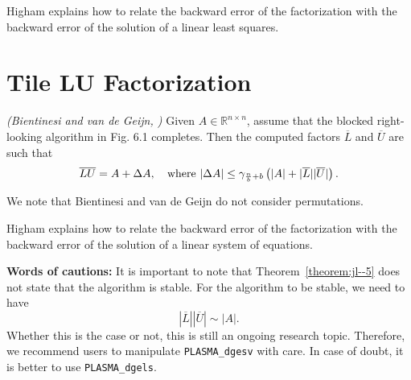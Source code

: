 Higham explains how to relate the backward error of the factorization
with the backward error of the solution of a linear least squares.

\section{Tile LU Factorization}

\begin{theorem}\emph{(Bientinesi and van de Geijn, \cite[Th.6.5]{Bientinesi:2009:SDS})}
Given $A\in \mathbb{R}^{n\times n}$, assume that the blocked right-looking algorithm in Fig. 6.1 completes.
Then the computed factors $\overline{L}$ and $\overline{U}$ are such that 
\begin{equation*}
\label{theorem:jl--5}
\overline{L}\overline{U} =  A + \Delta A, \quad \textmd{where } | \Delta A | \leq \gamma_{\frac{n}{b}+b} \left( | A | + |\overline{L}||\overline{U}| \right).
\end{equation*}
\end{theorem}

We note that Bientinesi and van de Geijn do not consider permutations.

Higham explains how to relate the backward error of the factorization
with the backward error of the solution of a linear system of equations.

{\bf Words of cautions:} It is important to note that Theorem~\ref{theorem:jl--5} does not state that the algorithm is stable.
For the algorithm to be stable, we need to have
\begin{equation*}
 |\overline{L}||\overline{U}| \sim | A |.
\end{equation*}
Whether this is the case or not, this is still an ongoing research topic.
Therefore, we recommend users to manipulate \texttt{PLASMA\_dgesv} with care.
In case of doubt, it is better to use  \texttt{PLASMA\_dgels}.
